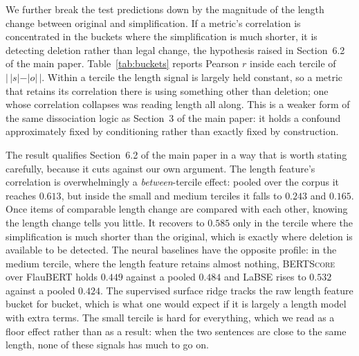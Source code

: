 \documentclass[11pt]{article}
\begin{document}
We further break the test predictions down by the magnitude of the length change
between original and simplification. If a metric's correlation is concentrated
in the buckets where the simplification is much shorter, it is detecting
deletion rather than legal change, the hypothesis raised in
Section~6.2 of the main paper. Table~\ref{tab:buckets} reports Pearson $r$ inside each
tercile of $|\,|s|-|o|\,|$. Within a tercile the length signal is largely held
constant, so a metric that retains its correlation there is using something
other than deletion; one whose correlation collapses was reading length all
along. This is a weaker form of the same dissociation logic as
Section~3 of the main paper: it holds a confound approximately fixed by conditioning
rather than exactly fixed by construction.

\begin{table}[t]\centering\small

\caption{Correlation with the human label \emph{within} terciles of the
absolute length change, pooling test predictions over seeds. Restricting to a
tercile removes most of the length variance; a metric that measures legal
meaning should degrade far less than one that measures deletion.}
\label{tab:buckets}
\end{table}

The result qualifies Section~6.2 of the main paper in a way that is worth stating
carefully, because it cuts against our own argument. The length feature's
correlation is overwhelmingly a \emph{between}-tercile effect: pooled over the
corpus it reaches $0.613$, but inside the small and medium terciles it falls to
$0.243$ and $0.165$. Once items of comparable length change are compared with
each other, knowing the length change tells you little. It recovers to $0.585$
only in the tercile where the simplification is much shorter than the original,
which is exactly where deletion is available to be detected. The neural
baselines have the opposite profile: in the medium tercile, where the length
feature retains almost nothing, \textsc{BERTScore} over FlauBERT holds $0.449$
against a pooled $0.484$ and LaBSE rises to $0.532$ against a pooled $0.424$. The
supervised surface ridge tracks the raw length feature bucket for bucket, which
is what one would expect if it is largely a length model with extra terms. The
small tercile is hard for everything, which we read as a floor effect rather
than as a result: when the two sentences are close to the same length, none of
these signals has much to go on.
\end{document}
